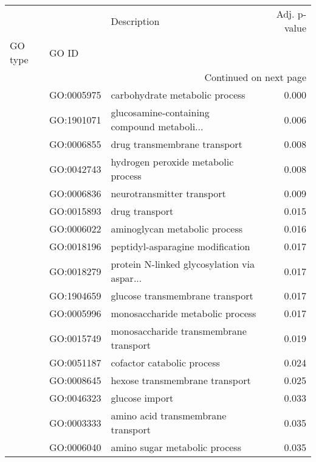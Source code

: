 \begin{longtable}{lllr}
\toprule
   &            &                                  Description &  Adj. p-value \\
GO type & GO ID &                                              &               \\
\midrule
\endhead
\midrule
\multicolumn{4}{r}{{Continued on next page}} \\
\midrule
\endfoot

\bottomrule
\endlastfoot
\multirow{39}{*}{BP} & GO:0005975 &               carbohydrate metabolic process &         0.000 \\
   & GO:1901071 &  glucosamine-containing compound metaboli... &         0.006 \\
   & GO:0006855 &                 drug transmembrane transport &         0.008 \\
   & GO:0042743 &          hydrogen peroxide metabolic process &         0.008 \\
   & GO:0006836 &                   neurotransmitter transport &         0.009 \\
   & GO:0015893 &                               drug transport &         0.015 \\
   & GO:0006022 &                aminoglycan metabolic process &         0.016 \\
   & GO:0018196 &             peptidyl-asparagine modification &         0.017 \\
   & GO:0018279 &  protein N-linked glycosylation via aspar... &         0.017 \\
   & GO:1904659 &              glucose transmembrane transport &         0.017 \\
   & GO:0005996 &             monosaccharide metabolic process &         0.017 \\
   & GO:0015749 &       monosaccharide transmembrane transport &         0.019 \\
   & GO:0051187 &                   cofactor catabolic process &         0.024 \\
   & GO:0008645 &               hexose transmembrane transport &         0.025 \\
   & GO:0046323 &                               glucose import &         0.033 \\
   & GO:0003333 &           amino acid transmembrane transport &         0.035 \\
   & GO:0006040 &                amino sugar metabolic process &         0.035 \\

\end{longtable}

